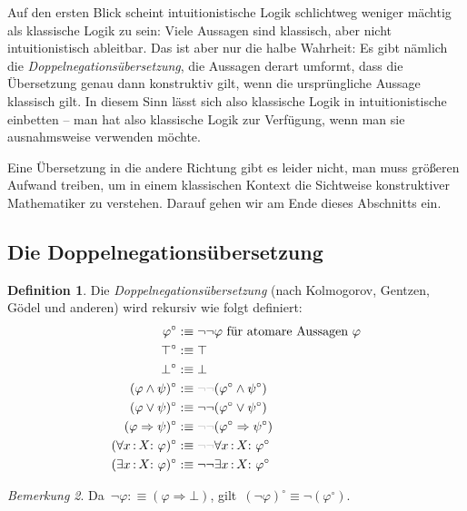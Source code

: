 \documentclass[a4paper,ngerman,12pt]{scrartcl}
\theoremstyle{definition}
\newtheorem{defn}{Definition}[section]
\theoremstyle{plain}
\theoremstyle{remark}
\newtheorem{bem}[defn]{Bemerkung}
\renewcommand{\_}{\mathpunct{.}\,}
\newcommand{\?}{\,{:}\,}
\begin{document}
Auf den ersten Blick scheint intuitionistische Logik schlichtweg weniger
mächtig als klassische Logik zu sein: Viele Aussagen sind klassisch, aber nicht
intuitionistisch ableitbar. Das ist aber nur die halbe
Wahrheit: Es gibt nämlich die \emph{Doppel\-ne\-ga\-tions\-über\-set\-zung},
die Aussagen derart umformt, dass die
Übersetzung genau dann konstruktiv gilt, wenn die ursprüngliche Aussage
klassisch gilt. In diesem Sinn lässt sich also klassische Logik in
intuitionistische einbetten -- man hat also klassische Logik zur Verfügung,
wenn man sie ausnahmsweise verwenden möchte.

Eine Übersetzung in die andere Richtung gibt es leider nicht, man muss größeren
Aufwand treiben, um in einem klassischen Kontext die Sichtweise konstruktiver
Mathematiker zu verstehen. Darauf gehen wir am Ende dieses Abschnitts ein.


\subsection{Die Doppelnegationsübersetzung}

\begin{defn}Die \emph{Doppelnegationsübersetzung} (nach Kolmogorov, Gentzen,
Gödel und anderen) wird rekursiv wie folgt definiert:
\newcommand{\optnegneg}{\textcolor{grey}{\neg\neg}}
\begin{align*}
  \varphi^\circ &:\equiv \neg\neg \varphi \text{ für atomare Aussagen~$\varphi$} \\
  \top^\circ &:\equiv \top \\
  \bot^\circ &:\equiv \bot \\
  (\varphi \wedge \psi)^\circ &:\equiv \optnegneg(\varphi^\circ \wedge \psi^\circ) \\
  (\varphi \vee \psi)^\circ &:\equiv \neg\neg(\varphi^\circ \vee \psi^\circ) \\
  (\varphi \Rightarrow \psi)^\circ &:\equiv \optnegneg(\varphi^\circ \Rightarrow \psi^\circ) \\
  (\forall x\?X{:}\ \varphi)^\circ &:\equiv \optnegneg\forall x\?X{:}\ \varphi^\circ \\
  (\exists x\?X{:}\ \varphi)^\circ &:\equiv \neg\neg\exists x\?X{:}\ \varphi^\circ
\end{align*}
\end{defn}

\begin{bem}Da~$\neg\varphi :\equiv (\varphi \Rightarrow \bot)$,
gilt~$(\neg\varphi)^\circ \equiv \neg(\varphi^\circ)$.\end{bem}
\end{document}
